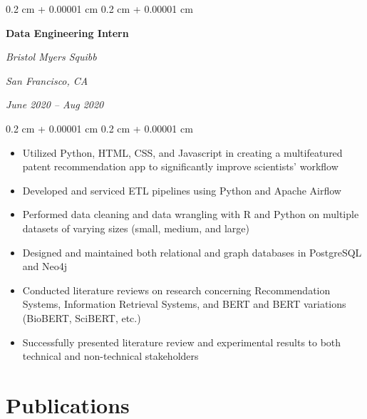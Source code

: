 \documentclass[10pt, letterpaper]{article}
\newenvironment{highlights}{
    \begin{itemize}[
        topsep=0.10 cm,
        parsep=0.10 cm,
        partopsep=0pt,
        itemsep=0pt,
        leftmargin=0.4 cm + 10pt
    ]
}{
    \end{itemize}
} %
\newenvironment{onecolentry}{
    \begin{adjustwidth}{
        0.2 cm + 0.00001 cm
    }{
        0.2 cm + 0.00001 cm
    }
}{
    \end{adjustwidth}
} %
\newenvironment{twocolentry}[2][]{
    \onecolentry
    \def\secondColumn{#2}
    \setcolumnwidth{\fill, 4.5 cm}
    \begin{paracol}{2}
}{
    \switchcolumn \raggedleft \secondColumn
    \end{paracol}
    \endonecolentry
} %
\begin{document}
        \vspace{0.2 cm}

        \begin{twocolentry}{
        \textit{San Francisco, CA}    
            
        \textit{June 2020 – Aug 2020}}
            \textbf{Data Engineering Intern}
            
            \textit{Bristol Myers Squibb}
        \end{twocolentry}

        \vspace{0.10 cm}
        \begin{onecolentry}
            \begin{highlights}
                \item Utilized Python, HTML, CSS, and Javascript in creating a multifeatured patent recommendation app to significantly improve scientists' workflow
                \item Developed and serviced ETL pipelines using Python and Apache Airflow
                \item Performed data cleaning and data wrangling with R and Python on multiple datasets of varying sizes (small, medium, and large)
                \item Designed and maintained both relational and graph databases in PostgreSQL and Neo4j
                \item Conducted literature reviews on research concerning Recommendation Systems, Information Retrieval Systems, and BERT and BERT variations (BioBERT, SciBERT, etc.)
                \item Successfully presented literature review and experimental results to both technical and non-technical stakeholders
            \end{highlights}
        \end{onecolentry}



    
    \section{Publications}
\end{document}
